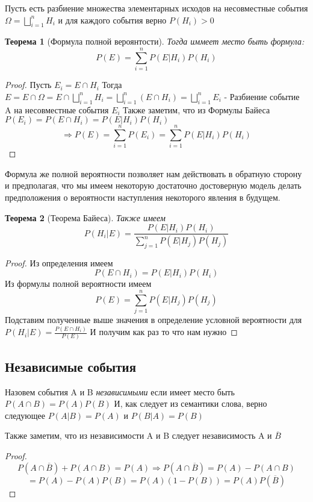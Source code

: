 \documentclass{article}
\newtheorem{theorem}{Теорема}
\theoremstyle{definition}
\theoremstyle{remark}
\begin{document}
Пусть есть разбиение множества элементарных исходов на несовместные события $\varOmega = \bigsqcup\limits_{i=1}^n H_i$
и для каждого события верно $P(H_i) > 0$

\begin{theorem}[Формула полной вероянтости]
    Тогда иммеет место быть формула: 
    $$
    P(E) = \sum_{i=1}^{n} P(E | H_i)P(H_i)
    $$
\end{theorem}
\begin{proof}
    Пусть $E_i = E \cap H_i$
    Тогда $E = E \cap \varOmega = E \cap \bigsqcup\limits_{i=1}^n H_i = \bigsqcup\limits_{i=1}^n (E \cap H_i) = \bigsqcup\limits_{i=1}^n E_i$
    - Разбиение событие A на несовместные события $E_i$ 
    Также заметим, что из Формулы Байеса $P(E_i) = P(E \cap H_i) = P(E | H_i)P(H_i)$ 
    $$
    \Rightarrow P(E) = \sum_{i=1}^{n} P(E_i) = \sum_{i=1}^{n} P(E | H_i)P(H_i)
    $$
\end{proof}

Формула же полной вероятности позволяет нам действовать в обратную сторону и предполагая, что мы имеем некоторую достаточно достоверную модель
делать предположения о вероятности наступления некоторого явления в будущем.

\begin{theorem}[Теорема Байеса]
    Также имеем 
    $$
    P(H_i | E) = \frac{P(E | H_i)P(H_i)}{\sum_{j=1}^{n} P(E | H_j)P(H_j)}
    $$
\end{theorem}
\begin{proof}
    Из определения имеем 
    $$
    P(E \cap H_i) = P(E | H_i)P(H_i)
    $$
    Из формулы полной вероятности имеем 
    $$
    P(E) = \sum_{j=1}^{n} P(E | H_j)P(H_j)
    $$
    Подставим полученные выше значения в определение условной вероятности для $P(H_i | E) = \frac{P(E \cap H_i)}{P(E)}$
    И получим как раз то что нам нужно
\end{proof}

\subsection{Независимые события}

Назовем события A и B \textit{независимыми} если имеет место быть $P(A \cap B) = P(A)P(B)$
И, как следует из семантики слова, верно следующее $P(A | B) = P(A)$ и $P(B | A) = P(B)$

Также заметим, что из независимости A и B следует независимость A и $\overline{B}$
\begin{proof}
    $$
    P(A \cap \overline{B}) + P(A \cap B) = P(A)
    \Rightarrow P(A \cap \overline{B}) = P(A) - P(A \cap B)
    $$
    $$
    = P(A) - P(A)P(B) = P(A)(1 - P(B)) = P(A)P(\overline{B})
    $$
\end{proof}
\end{document}
